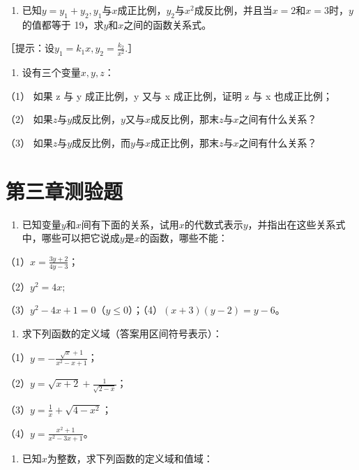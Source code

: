 \begin{enumerate}[start=5]
\item
  已知\(y = y_{1} + y_{2}, y_{1}\)与\(x\)成正比例，\(y_{2}\)与\(x^{2}\)成反比例，并且当\(x = 2\)和\(x = 3\)时，\(y\)的值都等于
  19，求\(y\)和\(x\)之间的函数关系式。
\end{enumerate}

［提示：设\(y_{1} = k_{1}x, y_{2} = \frac{k_{2}}{x^{2}}\).］

\begin{enumerate}[start=6]
\item
  设有三个变量\(x, y, z\)：
\end{enumerate}

（1） 如果 z 与 y 成正比例，y 又与 x 成正比例，证明 z 与 x 也成正比例；

（2）
如果\(z\)与\(y\)成反比例，\(y\)又与\(x\)成反比例，那末\(z\)与\(x\)之间有什么关系？

（3）
如果\(z\)与\(y\)成反比例，而\(y\)与\(x\)成正比例，那末\(z\)与\(x\)之间有什么关系？

\section{第三章测验题}

\begin{enumerate}
\item
  已知变量\(y\)和\(x\)间有下面的关系，试用\(x\)的代数式表示\(y\)，并指出在这些关系式中，哪些可以把它说成\(y\)是\(x\)的函数，哪些不能：
\end{enumerate}

（1）\(x = \frac{3y + 2}{4y - 3}\)；

（2）\(y^{2}=4x;\)

（3）\(y^{2}-4x+1=0\)（\(y\leqslant0\)）；（4）\((x+3)(y-2)=y-6\)。

\begin{enumerate}[start=2]
\item
  求下列函数的定义域（答案用区间符号表示）：
\end{enumerate}

（1）\(y = -\frac{\sqrt{x} + 1}{x^2 - x + 1}\)；

（2）\(y = \sqrt{x + 2} + \frac{1}{\sqrt{2 - x}}\)；

（3）\(y = \frac{1}{x} + \sqrt{4 - x^2}\)；

（4）\(y = \frac{x^2 + 1}{x^2 - 3x + 1}\)。

\begin{enumerate}[start=3]
\item
  已知\(x\)为整数，求下列函数的定义域和值域：
\end{enumerate}

